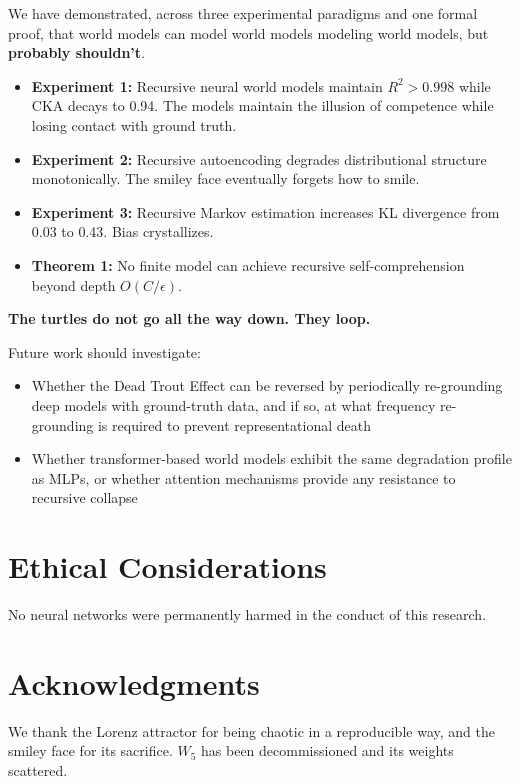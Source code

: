 \documentclass[11pt, twocolumn]{article}
\begin{document}
We have demonstrated, across three experimental paradigms and one formal proof, that world models can model world models modeling world models, but \textbf{probably shouldn't}.

\begin{itemize}[nosep]
    \item \textbf{Experiment 1:} Recursive neural world models maintain $R^2 > 0.998$ while CKA decays to 0.94. The models maintain the illusion of competence while losing contact with ground truth.
    \item \textbf{Experiment 2:} Recursive autoencoding degrades distributional structure monotonically. The smiley face eventually forgets how to smile.
    \item \textbf{Experiment 3:} Recursive Markov estimation increases KL divergence from 0.03 to 0.43. Bias crystallizes.
    \item \textbf{Theorem 1:} No finite model can achieve recursive self-comprehension beyond depth $O(C/\epsilon)$.
\end{itemize}

\textbf{The turtles do not go all the way down. They loop.}

Future work should investigate:
\begin{itemize}[nosep]
    \item Whether the Dead Trout Effect can be reversed by periodically re-grounding deep models with ground-truth data, and if so, at what frequency re-grounding is required to prevent representational death
    \item Whether transformer-based world models exhibit the same degradation profile as MLPs, or whether attention mechanisms provide any resistance to recursive collapse
\end{itemize}

\section{Ethical Considerations}

No neural networks were permanently harmed in the conduct of this research.

\section*{Acknowledgments}

We thank the Lorenz attractor for being chaotic in a reproducible way, and the smiley face for its sacrifice. $W_5$ has been decommissioned and its weights scattered.
\end{document}
